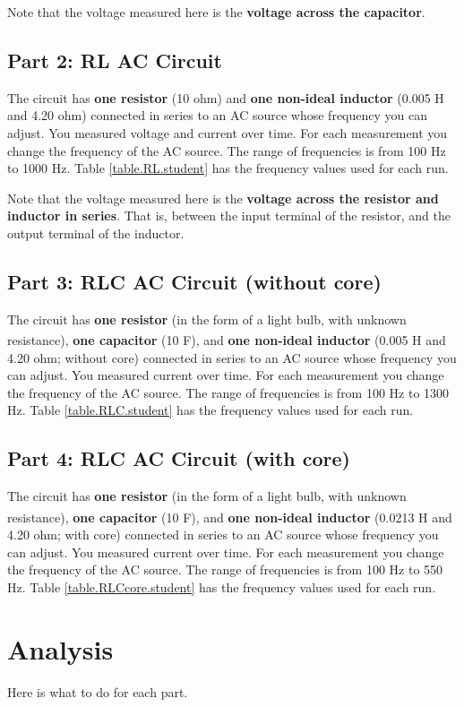 Note that the voltage measured here is the \textbf{voltage across the capacitor}.
%
\subsection{Part 2: RL AC Circuit}
%
The circuit has \textbf{one resistor} (10 ohm) and \textbf{one non-ideal inductor} (0.005 H and 4.20 ohm) connected in series to an AC source whose frequency you can adjust. You measured voltage and current over time. For each measurement you change the frequency of the AC source. The range of frequencies is from 100 Hz to 1000 Hz. Table \ref{table.RL.student} has the frequency values used for each run.

Note that the voltage measured here is the \textbf{voltage across the resistor and inductor in series}. That is, between the input terminal of the resistor, and the output terminal of the inductor.
%
\subsection{Part 3: RLC AC Circuit (without core)}
%
The circuit has \textbf{one resistor} (in the form of a light bulb, with unknown resistance), \textbf{one capacitor} (10\textsuperscript{} F), and \textbf{one non-ideal inductor} (0.005 H and 4.20 ohm; without core) connected in series to an AC source whose frequency you can adjust. You measured current over time. For each measurement you change the frequency of the AC source. The range of frequencies is from 100 Hz to 1300 Hz. Table \ref{table.RLC.student} has the frequency values used for each run.
%
\subsection{Part 4: RLC AC Circuit (with core)}
%
The circuit has \textbf{one resistor} (in the form of a light bulb, with unknown resistance), \textbf{one capacitor} (10\textsuperscript{} F), and \textbf{one non-ideal inductor} (0.0213 H and 4.20 ohm; with core) connected in series to an AC source whose frequency you can adjust. You measured current over time. For each measurement you change the frequency of the AC source. The range of frequencies is from 100 Hz to 550 Hz. Table \ref{table.RLCcore.student} has the frequency values used for each run.
%
\section{Analysis}
%
Here is what to do for each part.
%
